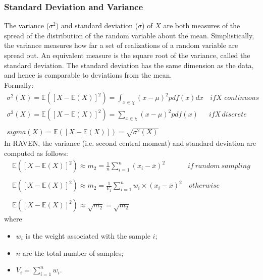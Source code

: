 \subsubsection{Standard Deviation and Variance}
The variance ($\sigma^{2}$) and standard deviation ($\sigma$) of $X$ are both measures of the spread of the distribution of the random variable about the 
mean. Simplistically, the variance measures how far a set of realizations of a random variable are spread out.
An equivalent measure is the square root of the variance, called the standard deviation. The standard deviation has the same dimension as the data, and hence is comparable to deviations from the mean.
\\Formally:
\begin{equation}
  \begin{matrix}
  \sigma^{2}(X)= \mathbb{E}\left(\left[X - \mathbb{E}(X)\right]^{2}\right) = \int_{x \in \chi} (x - \mu)^2 pdf(x) dx  & \, if X \, \, continuous \\
  \sigma^{2}(X)= \mathbb{E}\left(\left[X - \mathbb{E}(X)\right]^{2}\right)  = \sum_{x \in \chi} (x - \mu)^2 pdf(x)  & if X \, discrete
  \\
  \\ 
  sigma(X)= \mathbb{E}\left(\left[X - \mathbb{E}(X)\right]\right)  = \sqrt{\sigma^{2}(X)}
  \end{matrix}
\end{equation}
In RAVEN, the variance (i.e. second central moment) and standard deviation are computed as follows:
\begin{equation}
\begin{matrix}
\mathbb{E}\left(\left[X - \mathbb{E}(X)\right]^{2}\right)  \approx  m_{2} = \frac{1}{n} \sum_{i=1}^{n}  (x_{i} - \overline{x})^{2} & if \: random \: sampling \\ 
\\ 
\mathbb{E}\left(\left[X - \mathbb{E}(X)\right]^{2}\right)  \approx m_{2}  = \frac{1}{V_{1}} \sum_{i=1}^{n} w_{i} \times (x_{i} - \overline{x})^{2}  & \, otherwise
\\
\\
\mathbb{E}\left(\left[X - \mathbb{E}(X)\right]^{2}\right)  \approx \sqrt{m_{2}}  =  \sqrt{m_{2}}
\end{matrix}
\end{equation}
where 
\begin{itemize}
  \item $w_{i}$ is the weight associated with the sample $i$;
  \item $n$ are the total number of samples;
  \item $V_{i} = \sum_{i=1}^{n} w_{i}$.
\end{itemize}
